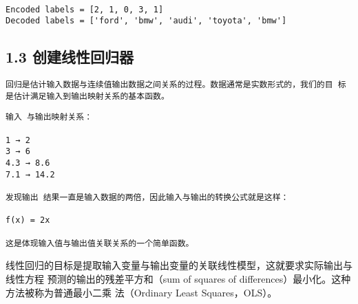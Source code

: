 \documentclass[11pt]{article}
\begin{document}
    \begin{Verbatim}[commandchars=\\\{\}]

Encoded labels = [2, 1, 0, 3, 1]
Decoded labels = ['ford', 'bmw', 'audi', 'toyota', 'bmw']

    \end{Verbatim}

    \subsection{1.3
创建线性回归器}\label{ux521bux5efaux7ebfux6027ux56deux5f52ux5668}

\begin{verbatim}
回归是估计输入数据与连续值输出数据之间关系的过程。数据通常是实数形式的，我们的目 标是估计满足输入到输出映射关系的基本函数。
\end{verbatim}

    \begin{verbatim}
输入 与输出映射关系： 

1 → 2
3 → 6 
4.3 → 8.6
7.1 → 14.2

发现输出 结果一直是输入数据的两倍，因此输入与输出的转换公式就是这样： 

f(x) = 2x 

这是体现输入值与输出值关联关系的一个简单函数。
\end{verbatim}

    线性回归的目标是提取输入变量与输出变量的关联线性模型，这就要求实际输出与线性方程
预测的输出的残差平方和（sum of squares of
differences）最小化。这种方法被称为普通最小二乘 法（Ordinary Least
Squares，OLS）。
\end{document}
